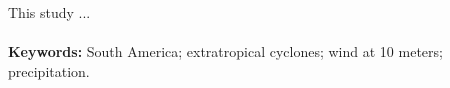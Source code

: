 This study ...
\\
\\


\noindent \textbf{Keywords:} South America; extratropical cyclones; wind at 10 meters; precipitation.


